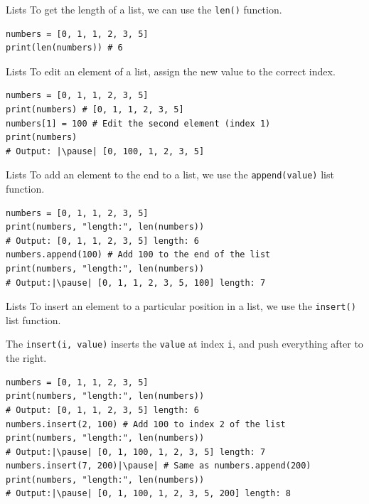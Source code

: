 \documentclass[dvipsnames, svgnames, x11names]{beamer}
\begin{document}
\begin{frame}[fragile]{Lists}
To get the length of a list, we can use the \texttt{len()} function. \pause
\begin{verbatim}
numbers = [0, 1, 1, 2, 3, 5]
print(len(numbers)) # 6
\end{verbatim}
\end{frame}

\begin{frame}[fragile]{Lists}
To edit an element of a list, assign the new value to the correct index. \pause
\begin{verbatim}
numbers = [0, 1, 1, 2, 3, 5]
print(numbers) # [0, 1, 1, 2, 3, 5]
numbers[1] = 100 # Edit the second element (index 1)
print(numbers)  
# Output: |\pause| [0, 100, 1, 2, 3, 5]
\end{verbatim}
\end{frame}

\begin{frame}[fragile]{Lists}
To add an element to the end to a list, we use the \texttt{append(value)} list function. \pause
\begin{verbatim}
numbers = [0, 1, 1, 2, 3, 5]
print(numbers, "length:", len(numbers)) 
# Output: [0, 1, 1, 2, 3, 5] length: 6
numbers.append(100) # Add 100 to the end of the list
print(numbers, "length:", len(numbers))
# Output:|\pause| [0, 1, 1, 2, 3, 5, 100] length: 7
\end{verbatim}
\end{frame}

\begin{frame}[fragile]{Lists}
To insert an element to a particular position in a list, we use the \texttt{insert()} list function.

The \texttt{insert(i, value)} inserts the \texttt{value} at index \texttt{i}, and push everything after to the right. \pause
\begin{verbatim}
numbers = [0, 1, 1, 2, 3, 5]
print(numbers, "length:", len(numbers)) 
# Output: [0, 1, 1, 2, 3, 5] length: 6
numbers.insert(2, 100) # Add 100 to index 2 of the list
print(numbers, "length:", len(numbers))  
# Output:|\pause| [0, 1, 100, 1, 2, 3, 5] length: 7
numbers.insert(7, 200)|\pause| # Same as numbers.append(200)
print(numbers, "length:", len(numbers))  
# Output:|\pause| [0, 1, 100, 1, 2, 3, 5, 200] length: 8
\end{verbatim}
\end{frame}
\end{document}

